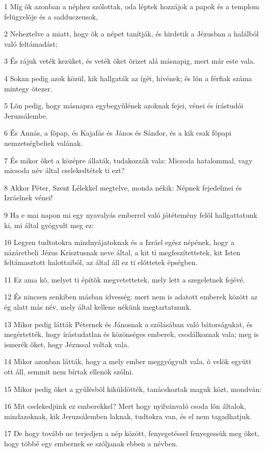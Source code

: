 \par 1 Míg õk azonban a néphez szólottak, oda léptek hozzájok a papok és a templom felügyelõje és a  sadduczeusok,
\par 2 Neheztelve a miatt, hogy õk a népet tanítják, és hirdetik a Jézusban a halálból való feltámadást;
\par 3 És rájuk veték kezüket, és veték õket õrizet alá másnapig, mert már este vala.
\par 4 Sokan pedig azok közül, kik hallgaták az ígét, hivének; és lõn a férfiak száma mintegy ötezer.
\par 5 Lõn pedig, hogy másnapra egybegyûlének azoknak fejei, vénei és írástudói Jeruzsálembe.
\par 6 És Annás, a fõpap, és Kajafás és János és Sándor, és a kik csak fõpapi nemzetségbeliek valának.
\par 7 És mikor õket a középre állaták, tudakozzák vala: Micsoda hatalommal, vagy micsoda név által cselekedtétek ti ezt?
\par 8 Akkor Péter, Szent Lélekkel megtelve, monda nékik: Népnek fejedelmei és Izráelnek vénei!
\par 9 Ha e mai napon mi egy nyavalyás emberrel való jótétemény felõl hallgattatunk ki, mi által gyógyult meg ez:
\par 10 Legyen tudtotokra mindnyájatoknak és a Izráel egész népének, hogy a názáretbeli Jézus Krisztusnak neve által, a kit ti megfeszítettetek, kit Isten feltámasztott halottaiból, az által áll ez ti elõttetek épségben.
\par 11 Ez ama kõ, melyet ti építõk megvetettetek, mely lett a szegeletnek fejévé.
\par 12 És nincsen senkiben másban idvesség: mert nem is adatott emberek között az ég alatt más név, mely által kellene nékünk megtartatnunk.
\par 13 Mikor pedig látták Péternek és Jánosnak a szólásában való bátorságukat, és megértették, hogy írástudatlan és közönséges emberek, csodálkoznak vala; meg is ismerék õket, hogy Jézussal voltak vala.
\par 14 Mikor azonban látták, hogy a mely ember meggyógyult vala, õ velök együtt ott áll, semmit nem bírtak ellenök szólni.
\par 15 Mikor pedig õket a gyûlésbõl kiküldötték, tanácskoztak maguk közt, mondván:
\par 16 Mit cselekedjünk ez emberekkel? Mert hogy nyilvánvaló csoda lõn általok, mindazoknak, kik Jeruzsálemben laknak, tudtokra van, és el nem tagadhatjuk.
\par 17 De hogy tovább ne terjedjen a nép között, fenyegetéssel fenyegessük meg õket, hogy többé egy embernek se szóljanak ebben a névben.
